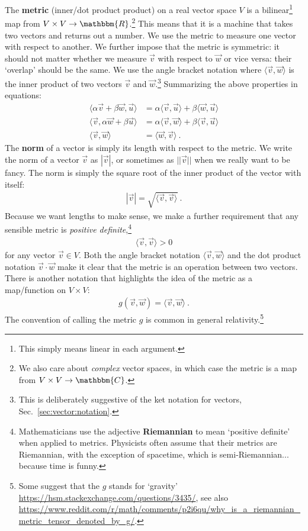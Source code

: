\documentclass[
  11pt,
	colorful,
	raggedright,
]{tufte-style-thesis-flip}
\begin{document}
The \textbf{metric} (inner/dot product product) on a real vector space $V$ is a bilinear\footnote{This simply means linear in each argument.} map from $V\times V\to \mathbbm{R}$.\footnote{We also care about \emph{complex} vector spaces, in which case the metric is a map from $V\times V\to \mathbbm{C}$.} This means that it is a machine that takes two vectors and returns out a number. We use the metric to measure one vector with respect to another. We further impose that the metric is symmetric: it should not matter whether we measure $\vec{v}$ with respect to $\vec{w}$ or vice versa: their `overlap' should be the same. 
%
We use the angle bracket notation where $\langle \vec{v},\vec{w}\rangle$ is the inner product of two vectors $\vec{v}$ and $\vec{w}$.\footnote{This is deliberately suggestive of the ket notation for vectors, Sec.~\ref{sec:vector:notation}.}
%
Summarizing the above properties in equations:
\begin{align}
  \langle \alpha \vec{v}+\beta\vec{w}, \vec{u} \rangle &=
  \alpha \langle \vec{v},\vec{u}\rangle +
  \beta \langle \vec{w},\vec{u}\rangle 
  \\
  \langle \vec{v}, \alpha \vec{w} + \beta \vec{u} \rangle &=
  \alpha \langle \vec{v},\vec{w}\rangle +
  \beta \langle \vec{v},\vec{u}\rangle 
  \\
  \langle \vec{v},\vec{w}\rangle  &=
  \langle \vec{w},\vec{v}\rangle  \ .
\end{align}
The \textbf{norm} of a vector is simply its length with respect to the metric. We write the norm of a vector $\vec{v}$ as $|\vec{v}|$, or sometimes as $||\vec{v}||$ when we really want to be fancy. The norm is simply the square root of the inner product of the vector with itself:
\begin{align}
  |\vec{v}| = \sqrt{\langle \vec{v}, \vec{v}\rangle} \ .
\end{align}
Because we want lengths to make sense, we make a further requirement that any sensible metric is \emph{positive definite},\footnote{Mathematicians use the adjective \textbf{Riemannian} to mean `positive definite' when applied to metrics. Physicists often assume that their metrics are Riemannian, with the exception of spacetime, which is semi-Riemannian... because time is funny.}
\begin{align}
  \langle \vec{v},\vec{v}\rangle > 0 
\end{align}
for any vector $\vec{v}\in V$. 
%
Both the angle bracket notation $\langle \vec v, \vec w \rangle$ and the dot product notation $\vec v \cdot \vec w$ make it clear that the metric is an operation between two vectors. There is another notation that highlights the idea of the metric as a map/function on $V\times V$:
\begin{align}
  g(\vec v, \vec w) = \langle \vec v, \vec w \rangle \ . 
\end{align}
The convention of calling the metric $g$ is common in general relativity.\footnote{Some suggest that the $g$ stands for `gravity' \url{https://hsm.stackexchange.com/questions/3435/}, see also \url{https://www.reddit.com/r/math/comments/p2i6qu/why_is_a_riemannian_metric_tensor_denoted_by_g/}.} 
\end{document}
